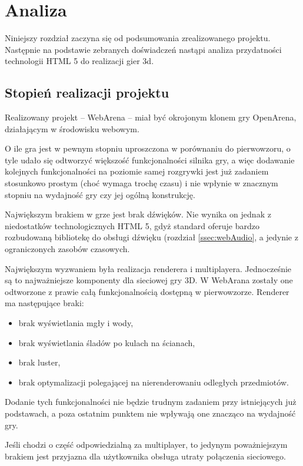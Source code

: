 \chapter{Analiza}
\label{cha:analiza}

Niniejszy rozdział zaczyna się od  podsumowania zrealizowanego projektu. Następnie na podstawie zebranych
doświadczeń nastąpi analiza przydatności technologii HTML 5 do realizacji gier 3d.

\section{Stopień realizacji projektu}
\label{sec:stopieńRealizacji}

Realizowany projekt -- WebArena -- miał być okrojonym klonem gry OpenArena, działającym w środowisku webowym.

O ile gra jest w pewnym stopniu uproszczona w porównaniu do pierwowzoru, o tyle udało się odtworzyć
większość funkcjonalności silnika gry, a więc dodawanie kolejnych funkcjonalności na poziomie samej
rozgrywki jest już zadaniem stosunkowo prostym (choć wymaga trochę czasu) i nie wpłynie w znacznym stopniu
na wydajność gry czy jej ogólną konstrukcję.

Największym brakiem w grze jest brak dźwięków. Nie wynika on jednak z niedostatków technologicznych
HTML 5, gdyż standard oferuje bardzo rozbudowaną bibliotekę do obsługi dźwięku (rozdział \ref{ssec:webAudio},
a jedynie z ograniczonych zasobów czasowych.

Największym wyzwaniem była realizacja renderera i multiplayera. Jednocześnie są to najważniejsze komponenty
dla sieciowej gry 3D. W WebArana zostały one odtworzone z prawie całą funkcjonalnością dostępną
w pierwowzorze. Renderer ma następujące braki:
\begin{itemize}
\item brak wyświetlania mgły i wody,
\item brak wyświetlania śladów po kulach na ścianach,
\item brak luster,
\item brak optymalizacji polegającej na nierenderowaniu odległych przedmiotów.
\end{itemize}

Dodanie tych funkcjonalności nie będzie trudnym zadaniem przy istniejących już podstawach, a poza ostatnim
punktem nie wpływają one znacząco na wydajność gry.

Jeśli chodzi o część odpowiedzialną za multiplayer, to jedynym poważniejszym brakiem jest przyjazna dla
użytkownika obsługa utraty połączenia sieciowego.

